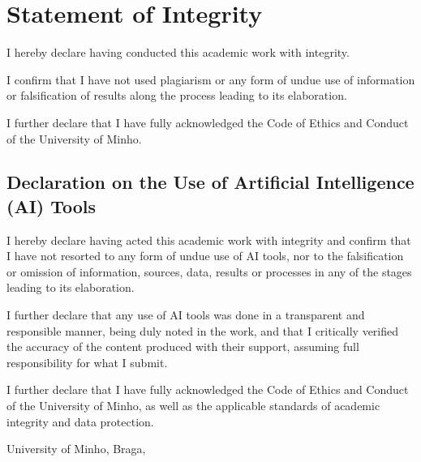 \chapter*{Statement of Integrity}
\setlength{\parskip}{1em}
\noindent
I hereby declare having conducted this academic work with integrity.

\noindent
I confirm that I have not used plagiarism or any form of undue use of information or falsification of results along the process leading to its elaboration.

\noindent
I further declare that I have fully acknowledged the Code of Ethics and Conduct of the University of Minho.

\section*{Declaration on the Use of Artificial Intelligence (AI) Tools}

\noindent
I hereby declare having acted this academic work with integrity and confirm that I have not resorted to any form of undue use of AI tools, nor to the falsification or omission of information, sources, data, results or processes in any of the stages leading to its elaboration.

\noindent
I further declare that any use of AI tools was done in a transparent and responsible manner, being duly noted in the work, and that I critically verified the accuracy of the content produced with their support, assuming full responsibility for what I submit.

\noindent
I further declare that I have fully acknowledged the Code of Ethics and Conduct of the University of Minho, as well as the applicable standards of academic integrity and data protection.

\noindent
University of Minho, Braga, \myear

\vspace{12mm}
\noindent\theauthor
\setlength{\parskip}{0em}
